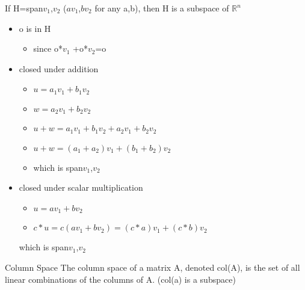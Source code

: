 \begin{ex}
If H=span{$v_1$,$v_2$} ({$av_1$,$bv_2$} for any a,b), then H is a subspace of $\mathbb{R}^n$
\begin{itemize}
\item o is in H \checkmark
\begin{itemize}
    \item since o*$v_1$ +o*$v_2$=o
\end{itemize}
\item closed under addition \checkmark
\begin{itemize}
    \item $u=a_1v_1+b_1v_2$
    \item $w=a_2v_1+b_2v_2$
    \item $u+w=a_1v_1+b_1v_2+a_2v_1+b_2v_2$
    \item $u+w=(a_1+a_2)v_1+(b_1+b_2)v_2$
    \item which is span{$v_1$,$v_2$}
\end{itemize}
\item closed under scalar multiplication
\begin{itemize}
    \item $u=av_1+bv_2$
    \item $c*u=c(av_1+bv_2)=(c*a)v_1+(c*b)v_2$
\end{itemize}
which is span{$v_1$,$v_2$}
\end{itemize}
\end{ex}
\begin{imp:defn}{Column Space}{} The column space of a matrix A, denoted col(A), is the set of all linear combinations of the columns of A. (col(a) is a subspace)
\end{imp:defn}
